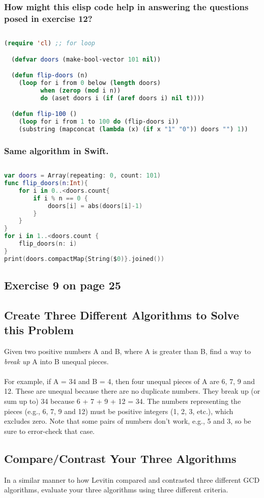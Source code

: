 \documentclass[12pt]{amsart}
\begin{document}
\subsubsection{How might this elisp code help in answering the questions posed in exercise 12?}$ $ 
\begin{lstlisting}[language=lisp, frame=single] 
(require 'cl) ;; for loop

  (defvar doors (make-bool-vector 101 nil))

  (defun flip-doors (n)
    (loop for i from 0 below (length doors)
          when (zerop (mod i n))
          do (aset doors i (if (aref doors i) nil t))))

  (defun flip-100 ()
    (loop for i from 1 to 100 do (flip-doors i))
    (substring (mapconcat (lambda (x) (if x "1" "0")) doors "") 1))
\end{lstlisting}
\pagebreak
\subsubsection{Same algorithm in Swift.}$ $

\begin{lstlisting}[language=Swift, frame=single]
var doors = Array(repeating: 0, count: 101)
func flip_doors(n:Int){
    for i in 0..<doors.count{
        if i % n == 0 {
            doors[i] = abs(doors[i]-1)
        }
    }
}
for i in 1..<doors.count {
    flip_doors(n: i)
}
print(doors.compactMap{String($0)}.joined())
\end{lstlisting}

\subsection{Exercise 9 on page 25} 
\subsection{Create Three Different Algorithms to Solve this Problem}
Given two positive numbers A and B, where A is greater than B, find a way to \textit{break up} A into B unequal pieces.\\\\For example, if A = 34 and B = 4, then four unequal pieces of A are 6, 7, 9 and 12. These are unequal because there are no duplicate numbers. They break up (or sum up to) 34 because 6 + 7 + 9 + 12 = 34. The numbers representing the pieces (e.g., 6, 7, 9 and 12) must be positive integers (1, 2, 3, etc.), which excludes zero. Note that some pairs of numbers don't work, e.g., 5 and 3, so be sure to error-check that case.

\subsection{Compare/Contrast Your Three Algorithms}
In a similar manner to how Levitin compared and contrasted three different GCD algorithms, evaluate your three algorithms using three different criteria.
\end{document}
